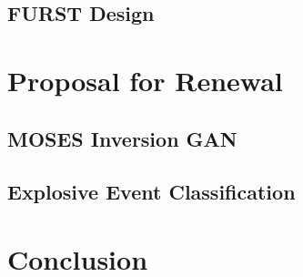 \documentclass[10pt,letterpaper]{article}
\begin{document}
		\subsection{FURST Design}
	
	\section{Proposal for Renewal}
	
		\subsection{MOSES Inversion GAN} \label{sec_gan}
		
		
		\subsection{Explosive Event Classification}
		

	
	\section{Conclusion}
	\begin{landscape}
		
	\end{landscape}
	
\end{document}
